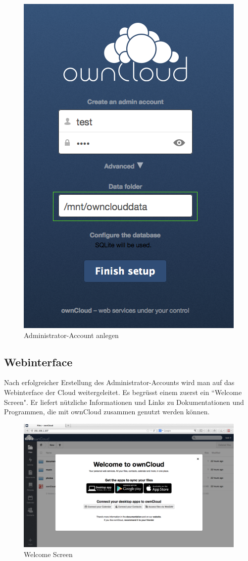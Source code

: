\begin{figure}[h]
\centering
\includegraphics[scale=0.5]{images/admin_setup}
\caption{Administrator-Account anlegen}
\end{figure}

\subsection{Webinterface}
Nach erfolgreicher Erstellung des Administrator-Accounts wird man auf das Webinterface der Cloud weitergeleitet. Es begrüsst einem zuerst ein ``Welcome Screen". Er liefert nützliche Informationen und Links zu Dokumentationen und Programmen, die mit ownCloud zusammen genutzt werden können. 

\begin{figure}[h]
\centering
\includegraphics[scale=0.4]{images/welcomescreen}
\caption{Welcome Screen}
\end{figure}

